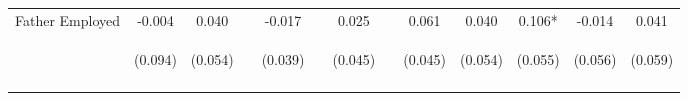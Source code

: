 \begin{tabular}{lcccccccccccc}
\noalign{\smallskip}Father Employed & -0.004 & 0.040 &  & -0.017 &  & 0.025 &  & 0.061 & 0.040 & 0.106* & -0.014 & 0.041\\
 & \begin{footnotesize}(0.094)\end{footnotesize} & \begin{footnotesize}(0.054)\end{footnotesize} & \begin{footnotesize}\end{footnotesize} & \begin{footnotesize}(0.039)\end{footnotesize} & \begin{footnotesize}\end{footnotesize} & \begin{footnotesize}(0.045)\end{footnotesize} & \begin{footnotesize}\end{footnotesize} & \begin{footnotesize}(0.045)\end{footnotesize} & \begin{footnotesize}(0.054)\end{footnotesize} & \begin{footnotesize}(0.055)\end{footnotesize} & \begin{footnotesize}(0.056)\end{footnotesize} & \begin{footnotesize}(0.059)\end{footnotesize}\\
\noalign{\smallskip}\hline\end{tabular}\\

